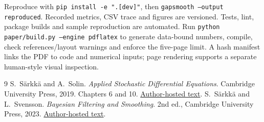 \documentclass[10pt,a4paper]{article}
\begin{document}
Reproduce with \texttt{pip install -e ".[dev]"}, then
\texttt{gapsmooth --output reproduced}. Recorded metrics, CSV trace and figures
are versioned. Tests, lint, package builds and sample reproduction are automated.
Run \texttt{python paper/build.py --engine pdflatex} to generate data-bound
numbers, compile, check references/layout warnings and enforce the five-page
limit. A hash manifest links the PDF to code and numerical inputs; page rendering
supports a separate human-style visual inspection.

\begin{thebibliography}{9}
 S.~S\"arkk\"a and A.~Solin. \emph{Applied Stochastic Differential
Equations}. Cambridge University Press, 2019. Chapters 6 and 10.
\href{https://users.aalto.fi/~asolin/sde-book/sde-book.pdf}{Author-hosted text}.
 S.~S\"arkk\"a and L.~Svensson. \emph{Bayesian Filtering and Smoothing}.
2nd ed., Cambridge University Press, 2023.
\href{https://users.aalto.fi/~ssarkka/pub/bfs_book_2023_online.pdf}{Author-hosted text}.
\end{thebibliography}
\end{document}
